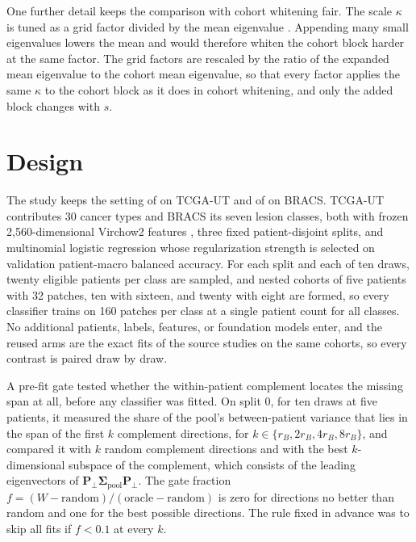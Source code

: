\documentclass[11pt]{article}
\begin{document}
One further detail keeps the comparison with cohort whitening fair. The scale $\kappa$ is tuned as a grid factor divided by the mean eigenvalue \citep{queisler2026patientDirections}. Appending many small eigenvalues lowers the mean and would therefore whiten the cohort block harder at the same factor. The grid factors are rescaled by the ratio of the expanded mean eigenvalue to the cohort mean eigenvalue, so that every factor applies the same $\kappa$ to the cohort block as it does in cohort whitening, and only the added block changes with $s$.

\section{Design}
\label{sec:design}
The study keeps the setting of \citet{queisler2026centreError} on TCGA-UT and of \citet{queisler2026bracsMechanism} on BRACS. TCGA-UT contributes 30 cancer types and BRACS its seven lesion classes, both with frozen 2,560-dimensional Virchow2 features \citep{zimmermann2024virchow2}, three fixed patient-disjoint splits, and multinomial logistic regression whose regularization strength is selected on validation patient-macro balanced accuracy. For each split and each of ten draws, twenty eligible patients per class are sampled, and nested cohorts of five patients with 32 patches, ten with sixteen, and twenty with eight are formed, so every classifier trains on 160 patches per class at a single patient count for all classes. No additional patients, labels, features, or foundation models enter, and the reused arms are the exact fits of the source studies on the same cohorts, so every contrast is paired draw by draw.

A pre-fit gate tested whether the within-patient complement locates the missing span at all, before any classifier was fitted. On split 0, for ten draws at five patients, it measured the share of the pool's between-patient variance that lies in the span of the first $k$ complement directions, for $k\in\{r_B,2r_B,4r_B,8r_B\}$, and compared it with $k$ random complement directions and with the best $k$-dimensional subspace of the complement, which consists of the leading eigenvectors of $\mathbf P_\perp\boldsymbol\Sigma_{\text{pool}}\mathbf P_\perp$. The gate fraction $f=(W-\text{random})/(\text{oracle}-\text{random})$ is zero for directions no better than random and one for the best possible directions. The rule fixed in advance was to skip all fits if $f<0.1$ at every $k$.
\end{document}
